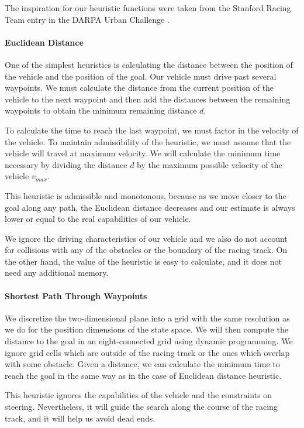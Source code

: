 The inspiration for our heuristic functions were taken from the Stanford Racing Team entry in the DARPA Urban Challenge \cite{dolgov08gppSTAIR}.

\paragraph{Euclidean Distance}
One of the simplest heuristics is calculating the distance between the position of the vehicle and the position of the goal. Our vehicle must drive past several waypoints. We must calculate the distance from the current position of the vehicle to the next waypoint and then add the distances between the remaining waypoints to obtain the minimum remaining distance $d$.

To calculate the time to reach the last waypoint, we must factor in the velocity of the vehicle. To maintain admissibility of the heuristic, we must assume that the vehicle will travel at maximum velocity. We will calculate the minimum time necessary by dividing the distance $d$ by the maximum possible velocity of the vehicle $v_{max}$.

This heuristic is admissible and monotonous, because as we move closer to the goal along any path, the Euclidean distance decreases and our estimate is always lower or equal to the real capabilities of our vehicle.

We ignore the driving characteristics of our vehicle and we also do not account for collisions with any of the obstacles or the boundary of the racing track. On the other hand, the value of the heuristic is easy to calculate, and it does not need any additional memory.

\paragraph{Shortest Path Through Waypoints}
We discretize the two-dimensional plane into a grid with the same resolution as we do for the position dimensions of the state space. We will then compute the distance to the goal in an eight-connected grid using dynamic programming. We ignore grid cells which are outside of the racing track or the ones which overlap with some obstacle. Given a distance, we can calculate the minimum time to reach the goal in the same way as in the case of Euclidean distance heuristic.

This heuristic ignores the capabilities of the vehicle and the constraints on steering. Nevertheless, it will guide the search along the course of the racing track, and it will help us avoid dead ends.

